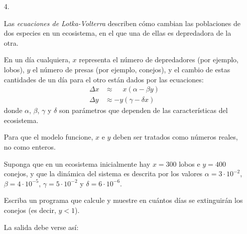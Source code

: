 \documentclass[11pt,spanish]{article}
\begin{document}
\begin{enumerate}[font=\Large\bfseries]
      \begin{minipage}[t]{.40\textwidth}
        
      \end{minipage}

    \newpage
    \item[4.]

      Las \emph{ecuaciones de Lotka-Volterra}
      describen cómo cambian las poblaciones de dos especies en un ecosistema,
      en el que una de ellas es depredadora de la otra.

      En un día cualquiera,
      \(x\) representa el número de depredadores (por ejemplo, lobos),
      \(y\) el número de presas (por ejemplo, conejos),
      y el cambio de estas cantidades de un día para el otro
      están dados por las ecuaciones:
      \begin{align*}
        \Delta x &\approx \phantom{-}x(\alpha - \beta  y) \\
        \Delta y &\approx           -y(\gamma - \delta x)
      \end{align*}
      donde \(\alpha\), \(\beta\), \(\gamma\) y \(\delta\)
      son parámetros que dependen de las características del ecosistema.

      Para que el modelo funcione,
      \(x\) e \(y\) deben ser tratados como números reales,
      no como enteros.

      Suponga que en un ecosistema inicialmente hay
      \(x = 300\) lobos e \(y = 400\) conejos,
      y que la dinámica del sistema es descrita por los valores
      \(\alpha = 3\cdot 10^{-2}\),
      \(\beta  = 4\cdot 10^{-5}\),
      \(\gamma = 5\cdot 10^{-2}\) y
      \(\delta = 6\cdot 10^{-6}\).

      Escriba un programa que calcule y muestre
      en cuántos días se extinguirán los conejos
      (es decir, \(y < 1\)).

      La salida debe verse así:

      \begin{minipage}[t]{.60\textwidth}
        
      \end{minipage}

  \end{enumerate}
\end{document}
